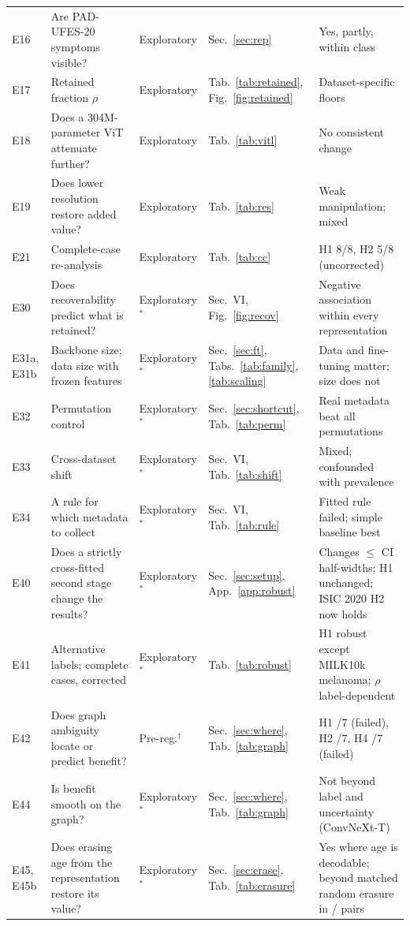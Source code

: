 \documentclass[conference]{IEEEtran}
\begin{document}
\begin{table}[tp]
\begin{tabular}{p{1.4cm}p{5.1cm}p{1.85cm}p{2.9cm}p{5.0cm}}
E16 & Are PAD-UFES-20 symptoms visible? & Exploratory & Sec.~\ref{sec:rep} & Yes, partly, within class\\
E17 & Retained fraction $\rho$ & Exploratory & Tab.~\ref{tab:retained}, Fig.~\ref{fig:retained} & Dataset-specific floors\\
E18 & Does a 304M-parameter ViT attenuate further? & Exploratory & Tab.~\ref{tab:vitl} & No consistent change\\
E19 & Does lower resolution restore added value? & Exploratory & Tab.~\ref{tab:res} & Weak manipulation; mixed\\
E21 & Complete-case re-analysis & Exploratory & Tab.~\ref{tab:cc} & H1 8/8, H2 5/8 (uncorrected)\\
E30 & Does recoverability predict what is retained? & Exploratory$^\ast$ & Sec.~VI, Fig.~\ref{fig:recov} & Negative association within every representation\\
E31a, E31b & Backbone size; data size with frozen features & Exploratory$^\ast$ & Sec.~\ref{sec:ft}, Tabs.~\ref{tab:family}, \ref{tab:scaling} & Data and fine-tuning matter; size does not\\
E32 & Permutation control & Exploratory$^\ast$ & Sec.~\ref{sec:shortcut}, Tab.~\ref{tab:perm} & Real metadata beat all permutations\\
E33 & Cross-dataset shift & Exploratory$^\ast$ & Sec.~VI, Tab.~\ref{tab:shift} & Mixed; confounded with prevalence\\
E34 & A rule for which metadata to collect & Exploratory$^\ast$ & Sec.~VI, Tab.~\ref{tab:rule} & Fitted rule failed; simple baseline best\\
E40 & Does a strictly cross-fitted second stage change the results? & Exploratory$^\ast$ & Sec.~\ref{sec:setup}, App.~\ref{app:robust} & Changes $\le$\ESTmaxHW{} CI half-widths; H1 unchanged; ISIC 2020 H2 now holds\\
E41 & Alternative labels; complete cases, corrected & Exploratory$^\ast$ & Tab.~\ref{tab:robust} & H1 robust except MILK10k melanoma; $\rho$ label-dependent\\
E42 & Does graph ambiguity locate or predict benefit? & Pre-reg.$^\dagger$ & Sec.~\ref{sec:where}, Tab.~\ref{tab:graph} & H1 \GRPhOne{}/7 (failed), H2 \GRPhTwo{}/7, H4 \GRPhFour{}/7 (failed)\\
E44 & Is benefit smooth on the graph? & Exploratory$^\ast$ & Sec.~\ref{sec:where}, Tab.~\ref{tab:graph} & Not beyond label and uncertainty (ConvNeXt-T)\\
E45, E45b & Does erasing age from the representation restore its value? & Exploratory$^\ast$ & Sec.~\ref{sec:erase}, Tab.~\ref{tab:erasure} & Yes where age is decodable; beyond matched random erasure in \ERASEheld{}/\ERASEn{} pairs\\

\end{tabular}
\end{table}
\end{document}
